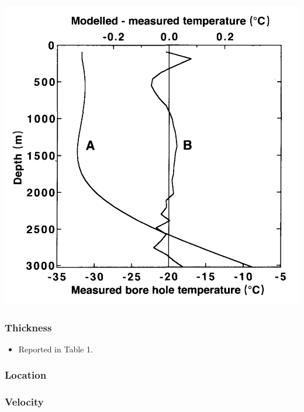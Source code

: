 \documentclass[article,a4paper,times,11pt,twoside]{article}
\begin{document}
\begin{center}
\includegraphics[width=.9\linewidth]{grip/johnsen_1995_fig1.png}
\end{center}

\subsubsection{Thickness}
\label{sec:org64ca639}

\begin{itemize}
\item Reported in \textcite{montagnat_2014} Table 1.
\end{itemize}

\subsubsection{Location}
\label{sec:orgb832537}

\subsubsection{Velocity}
\label{sec:orgb7f5f29}
\clearpage
\end{document}
